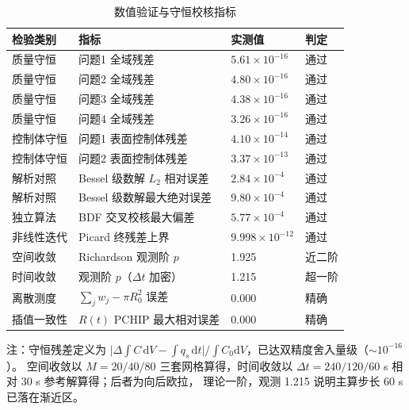 \begin{table}[H]
  \centering
  \caption{数值验证与守恒校核指标}
  \label{tab:verification}
  \small
  \begin{tabular}{llll}
    \toprule
    检验类别 & 指标 & 实测值 & 判定 \\
    \midrule
    质量守恒 & 问题1 全域残差              & $5.61{\times}10^{-16}$ & 通过 \\
    质量守恒 & 问题2 全域残差              & $4.80{\times}10^{-16}$ & 通过 \\
    质量守恒 & 问题3 全域残差              & $4.38{\times}10^{-16}$ & 通过 \\
    质量守恒 & 问题4 全域残差              & $3.26{\times}10^{-16}$ & 通过 \\
    控制体守恒 & 问题1 表面控制体残差       & $4.10{\times}10^{-14}$ & 通过 \\
    控制体守恒 & 问题2 表面控制体残差       & $3.37{\times}10^{-13}$ & 通过 \\
    \midrule
    解析对照 & Bessel 级数解 $L_2$ 相对误差 & $2.84{\times}10^{-4}$  & 通过 \\
    解析对照 & Bessel 级数解最大绝对误差    & $9.80{\times}10^{-4}$  & 通过 \\
    独立算法 & BDF 交叉校核最大偏差         & $5.77{\times}10^{-4}$  & 通过 \\
    \midrule
    非线性迭代 & Picard 终残差上界          & $9.998{\times}10^{-12}$ & 通过 \\
    空间收敛 & Richardson 观测阶 $p$        & 1.925                  & 近二阶 \\
    时间收敛 & 观测阶 $p$（$\Delta t$ 加密） & 1.215                  & 超一阶 \\
    离散测度 & $\sum_j w_j - \pi R_0^2$ 误差 & 0.000                 & 精确 \\
    插值一致性 & $R(t)$ PCHIP 最大相对误差   & 0.000                  & 精确 \\
    \bottomrule
  \end{tabular}

  \vspace{2pt}
  \parbox{0.94\linewidth}{\footnotesize
  注：守恒残差定义为 $\big|\Delta\!\int C\,\mathrm{d}V-\int\! q_s\,\mathrm{d}t\big|/\int C_0\mathrm{d}V$，已达双精度舍入量级（$\sim10^{-16}$）。
  空间收敛以 $M=20/40/80$ 三套网格算得，时间收敛以
  $\Delta t=240/120/60$ s 相对 $30$ s 参考解算得；后者为向后欧拉，
  理论一阶，观测 1.215 说明主算步长 60 s 已落在渐近区。}
\end{table}

